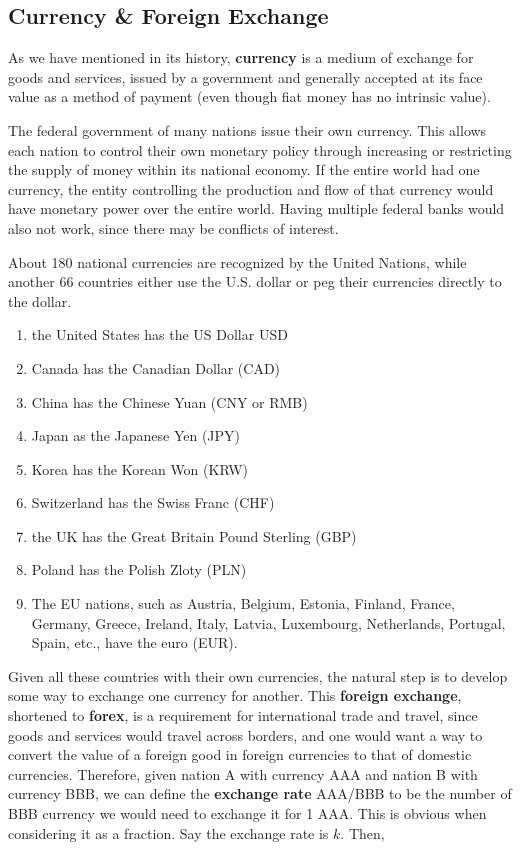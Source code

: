 \documentclass{article}
\begin{document}
  \subsection{Currency \& Foreign Exchange}

    As we have mentioned in its history, \textbf{currency} is a medium of exchange for goods and services, issued by a government and generally accepted at its face value as a method of payment (even though fiat money has no intrinsic value).

    The federal government of many nations issue their own currency. This allows each nation to control their own monetary policy through increasing or restricting the supply of money within its national economy. If the entire world had one currency, the entity controlling the production and flow of that currency would have monetary power over the entire world. Having multiple federal banks would also not work, since there may be conflicts of interest.

    About 180 national currencies are recognized by the United Nations, while another 66 countries either use the U.S. dollar or peg their currencies directly to the dollar.

    \begin{enumerate}
      \item the United States has the US Dollar USD
      \item Canada has the Canadian Dollar (CAD)
      \item China has the Chinese Yuan (CNY or RMB)
      \item Japan as the Japanese Yen (JPY)
      \item Korea has the Korean Won (KRW)
      \item Switzerland has the Swiss Franc (CHF)
      \item the UK has the Great Britain Pound Sterling (GBP)
      \item Poland has the Polish Zloty (PLN)
      \item The EU nations, such as Austria, Belgium, Estonia, Finland, France, Germany, Greece, Ireland, Italy, Latvia, Luxembourg, Netherlands, Portugal, Spain, etc., have the euro (EUR).
    \end{enumerate}

    Given all these countries with their own currencies, the natural step is to develop some way to exchange one currency for another. This \textbf{foreign exchange}, shortened to \textbf{forex}, is a requirement for international trade and travel, since goods and services would travel across borders, and one would want a way to convert the value of a foreign good in foreign currencies to that of domestic currencies. Therefore, given nation A with currency AAA and nation B with currency BBB, we can define the \textbf{exchange rate} AAA/BBB to be the number of BBB currency we would need to exchange it for 1 AAA. This is obvious when considering it as a fraction. Say the exchange rate is $k$. Then,
\end{document}
